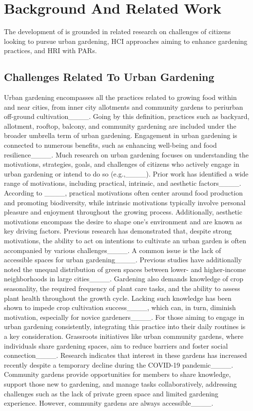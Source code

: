 \section{Background And Related Work}
\label{sec:rel}
The development of \system is grounded in related research on challenges of citizens looking to pursue urban gardening, HCI approaches aiming to enhance gardening practices, and HRI with PARs. 
\subsection{Challenges Related To Urban Gardening}\label{subsec:rel-challenges} Urban gardening encompasses all the practices related to growing food within and near cities, from inner city allotments and community gardens to periurban off-ground cultivation____. Going by this definition, practices such as backyard, allotment, rooftop, balcony, and community gardening are included under the broader umbrella term of urban gardening. Engagement in urban gardening is connected to numerous benefits, such as enhancing well-being and food resilience____. Much research on urban gardening focuses on understanding the motivations, strategies, goals, and challenges of citizens who actively engage in urban gardening or intend to do so (e.g.,____). Prior work has identified a wide range of motivations, including practical, intrinsic, and aesthetic factors____. According to ____, practical motivations often center around food production and promoting biodiversity, while intrinsic motivations typically involve personal pleasure and enjoyment throughout the growing process. Additionally, aesthetic motivations encompass the desire to shape one’s environment and are known as key driving factors. Previous research has demonstrated that, despite strong motivations, the ability to act on intentions to cultivate an urban garden is often accompanied by various challenges____. A common issue is the lack of accessible spaces for urban gardening____. Previous studies have additionally noted the unequal distribution of green spaces between lower- and higher-income neighborhoods in large cities____. Gardening also demands knowledge of crop seasonality, the required frequency of plant care tasks, and the ability to assess plant health throughout the growth cycle. Lacking such knowledge has been shown to impede crop cultivation success____, which can, in turn, diminish motivation, especially for novice gardeners____. For those aiming to engage in urban gardening consistently, integrating this practice into their daily routines is a key consideration. Grassroots initiatives like urban community gardens, where individuals share gardening spaces, aim to reduce barriers and foster social connection____. Research indicates that interest in these gardens has increased recently despite a temporary decline during the COVID-19 pandemic____. Community gardens provide opportunities for members to share knowledge, support those new to gardening, and manage tasks collaboratively, addressing challenges such as the lack of private green space and limited gardening experience. However, community gardens are always accessible____.


